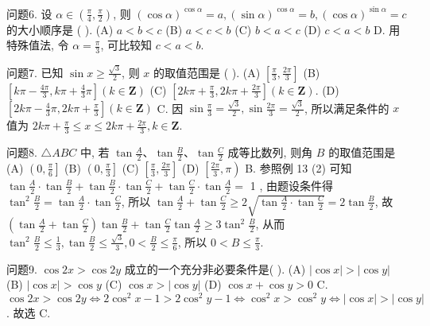 问题6. 设 $\alpha \in\left(\frac{\pi}{4}, \frac{\pi}{2}\right)$, 则 $(\cos \alpha)^{\cos \alpha}=a,(\sin \alpha)^{\cos \alpha}=b,(\cos \alpha)^{\sin \alpha}=c$ 的大小顺序是 ( ).
(A) $a<b<c$
(B) $a<c<b$
(C) $b<a<c$
(D) $c<a<b$
D. 用特殊值法, 令 $\alpha=\frac{\pi}{3}$, 可比较知 $c<a<b$.



问题7. 已知 $\sin x \geqslant \frac{\sqrt{3}}{2}$, 则 $x$ 的取值范围是 ( ).
(A) $\left[\frac{\pi}{3}, \frac{2 \pi}{3}\right]$
(B) $\left[k \pi-\frac{4 \pi}{3}, k \pi+\frac{4}{3} \pi\right](k \in \mathbf{Z})$
(C) $\left[2 k \pi+\frac{\pi}{3}, 2 k \pi+\frac{2 \pi}{3}\right](k \in \mathbf{Z})$.
(D) $\left[2 k \pi-\frac{4}{3} \pi, 2 k \pi+\frac{\pi}{3}\right](k \in \mathbf{Z})$
C. 因 $\sin \frac{\pi}{3}=\frac{\sqrt{3}}{2}, \sin \frac{2 \pi}{3}=\frac{\sqrt{3}}{2}$, 所以满足条件的 $x$ 值为 $2 k \pi+\frac{\pi}{3} \leqslant x \leqslant 2 k \pi+\frac{2 \pi}{3}, k \in \mathbf{Z}$.



问题8. $\triangle A B C$ 中, 若 $\tan \frac{A}{2} 、 \tan \frac{B}{2} 、 \tan \frac{C}{2}$ 成等比数列, 则角 $B$ 的取值范围是
(A) $\left(0, \frac{\pi}{6}\right]$
(B) $\left(0, \frac{\pi}{3}\right]$
(C) $\left[\frac{\pi}{3}, \frac{2 \pi}{3}\right]$
(D) $\left[\frac{2 \pi}{3}, \pi\right)$
B. 参照例 13 (2) 可知 $\tan \frac{A}{2} \cdot \tan \frac{B}{2}+\tan \frac{B}{2} \cdot \tan \frac{C}{2}+\tan \frac{C}{2} \cdot \tan \frac{A}{2}=$ 1 , 由题设条件得 $\tan ^2 \frac{B}{2}=\tan \frac{A}{2} \cdot \tan \frac{C}{2}$, 所以 $\tan \frac{A}{2}+\tan \frac{C}{2} \geqslant 2 \sqrt{\tan \frac{A}{2} \cdot \tan \frac{C}{2}}=2 \tan \frac{B}{2}$, 故 $\left(\tan \frac{A}{2}+\tan \frac{C}{2}\right) \tan \frac{B}{2}+\tan \frac{C}{2} \tan \frac{A}{2} \geqslant 3 \tan ^2 \frac{B}{2}$, 从而 $\tan ^2 \frac{B}{2} \leqslant \frac{1}{3}, \tan \frac{B}{2} \leqslant \frac{\sqrt{3}}{3}, 0<\frac{B}{2} \leqslant \frac{\pi}{6}$, 所以 $0<B \leqslant \frac{\pi}{3}$.



问题9. $\cos 2 x>\cos 2 y$ 成立的一个充分非必要条件是( ).
(A) $|\cos x|>|\cos y|$
(B) $|\cos x|>\cos y$
(C) $\cos x>|\cos y|$
(D) $\cos x+\cos y>0$
C. $\cos 2 x>\cos 2 y \Leftrightarrow 2 \cos ^2 x-1>2 \cos ^2 y-1 \Leftrightarrow \cos ^2 x>\cos ^2 y \Leftrightarrow |\cos x|>|\cos y|$. 故选 C.



